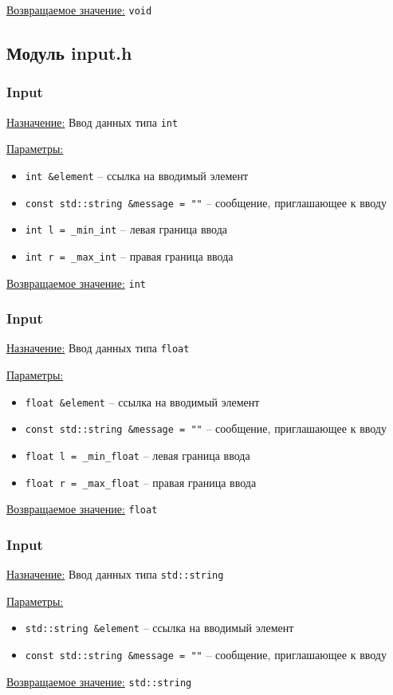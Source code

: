 \underline{Возвращаемое значение:} \verb|void|


\subsection*{Модуль input.h}

\subsubsection*{Input}

\underline{Назначение:} Ввод данных типа \verb|int|

\underline{Параметры:} 

\begin{itemize}
	\item \verb|int &element| -- ссылка на вводимый элемент
	\item \verb|const std::string &message = ""| -- сообщение, приглашающее к вводу
	\item \verb|int l = _min_int| -- левая граница ввода
	\item \verb|int r = _max_int| -- правая граница ввода
\end{itemize}

\underline{Возвращаемое значение:} \verb|int|


\subsubsection*{Input}

\underline{Назначение:} Ввод данных типа \verb|float|

\underline{Параметры:} 

\begin{itemize}
    \item \verb|float &element| -- ссылка на вводимый элемент
    \item \verb|const std::string &message = ""| -- сообщение, приглашающее к вводу
    \item \verb|float l = _min_float| -- левая граница ввода
    \item \verb|float r = _max_float| -- правая граница ввода
\end{itemize}

\underline{Возвращаемое значение:} \verb|float|


\subsubsection*{Input}

\underline{Назначение:} Ввод данных типа \verb|std::string|

\underline{Параметры:} 

\begin{itemize}
    \item \verb|std::string &element| -- ссылка на вводимый элемент
    \item \verb|const std::string &message = ""| -- сообщение, приглашающее к вводу
\end{itemize}

\underline{Возвращаемое значение:} \verb|std::string|